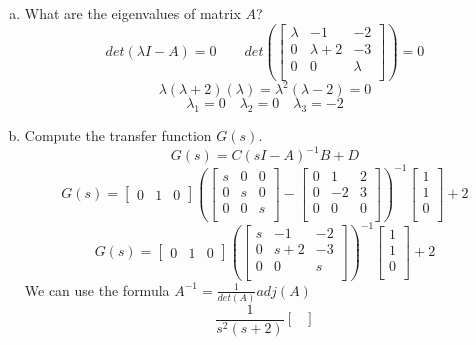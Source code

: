\documentclass{article}
\begin{document}
\begin{enumerate}[a.]
\item What are the eigenvalues of matrix $A$?
\newline
$$ det(\lambda I - A) = 0 \qquad
det(
\begin{bmatrix}
\lambda &  -1 & -2 \\
0 & \lambda+2 & -3 \\
0 &  0 & \lambda \\
\end{bmatrix}
)
=0
$$
$$\lambda(\lambda+2)(\lambda)= \lambda^2(\lambda-2)=0 $$
$$\lambda_1 = 0 \quad \lambda_2 = 0 \quad \lambda_3 = -2 $$


\item Compute the transfer function $G(s)$.
\newline
$$ G(s) = C(sI-A)^{-1}B + D $$
$$
G(s) =
\begin{bmatrix} 0 & 1 & 0 \end{bmatrix}
(
\begin{bmatrix}
s & 0 & 0 \\
0 & s & 0 \\
0 & 0 & s \\
\end{bmatrix}
-
\begin{bmatrix}
0 &  1 & 2 \\
0 & -2 & 3 \\
0 &  0 & 0 \\
\end{bmatrix}
)
^{-1}
\begin{bmatrix}
1 \\
1 \\
0 \\
\end{bmatrix}
+ 2
$$
$$
G(s) =
\begin{bmatrix} 0 & 1 & 0 \end{bmatrix}
(
\begin{bmatrix}
s &  -1 & -2 \\
0 & s+2 & -3 \\
0 &  0  &  s \\
\end{bmatrix}
)
^{-1}
\begin{bmatrix}
1 \\
1 \\
0 \\
\end{bmatrix}
+ 2
$$
We can use the formula $A^{-1} = \frac{1}{det(A)} adj(A)$
$$
\frac{1}{s^2(s+2)}
\begin{bmatrix}

\end{bmatrix}$$
\end{enumerate}
\end{document}
